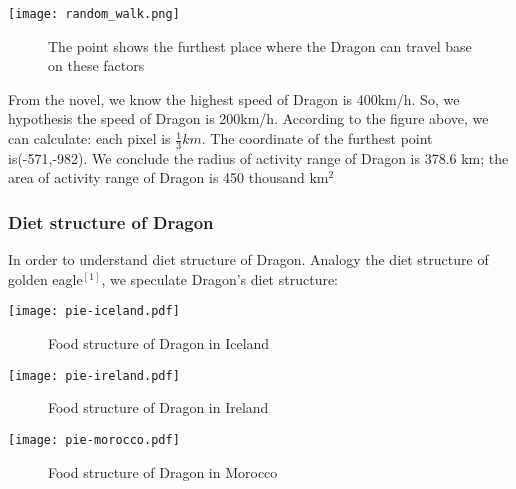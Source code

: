 \documentclass[12pt]{article}
\begin{document}
\centerline{\texttt{[image: random\_walk.png]}}%
\begin{figure}[!htbp]
    \small
    \caption{The point shows the furthest place where the Dragon can travel base on these factors}\label{jj}
\end{figure}
From the novel, we know the highest speed of Dragon is 400km/h. So, we hypothesis the speed of Dragon is 200km/h. According to the figure above, we can calculate: each pixel is $\frac{1}{3}km$. The coordinate of the furthest point is(-571,-982). We conclude the radius of activity range of Dragon is 378.6 km; the area of activity range of Dragon is 450 thousand km$^2$


\subsubsection{Diet structure of Dragon}%
In order to understand diet structure of Dragon. Analogy the diet structure of golden eagle$^{[1]}$, we speculate Dragon's diet structure:\\

\centerline{\texttt{[image: pie-iceland.pdf]}}%
\begin{figure}[!htbp]
    \small
    \caption{Food structure of Dragon in Iceland}\label{jj}
\end{figure}


\centerline{\texttt{[image: pie-ireland.pdf]}}%
\begin{figure}[!htbp]
    \small
    \caption{Food structure of Dragon in Ireland}\label{jj}
\end{figure}

\centerline{\texttt{[image: pie-morocco.pdf]}}%
\begin{figure}[!htbp]
    \small
    \caption{Food structure of Dragon in Morocco}\label{jj}
\end{figure}
\end{document}
